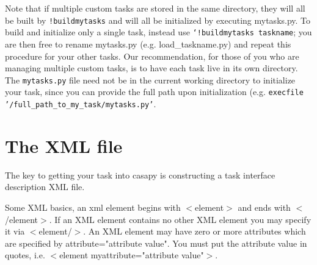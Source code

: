 Note that if multiple custom tasks are stored in the same directory,
they will all be built by {\tt !buildmytasks} and will all be
initialized by executing mytasks.py.  To build and initialize only a
single task, instead use {\tt `!buildmytasks taskname}; you are then
free to rename mytasks.py (e.g. load\_taskname.py) and repeat this
procedure for your other tasks.  Our recommendation, for those of you
who are managing multiple custom tasks, is to have each task live in
its own directory.  The {\tt mytasks.py} file need not be in the
current working directory to initialize your task, since you can
provide the full path upon initialization (e.g. {\tt execfile
  '/full\_path\_to\_my\_task/mytasks.py'}.






\section{The XML file}
\label{section:write.xml}

The key to getting your task into casapy is constructing a task
interface description XML file.

Some XML basics, an xml element begins with $<$element$>$ and ends
with $<$/element$>$. If an XML element contains no other XML element
you may specify it via $<$element/$>$. An XML element may have zero or
more attributes which are specified by attribute="attribute
value". You must put the attribute value in quotes, i.e. $<$element
myattribute="attribute value"$>$.

